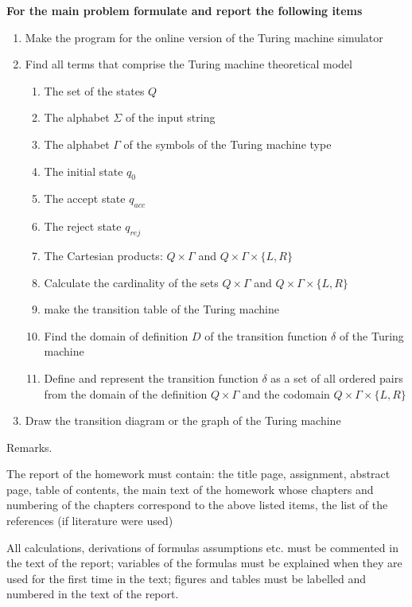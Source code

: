 \documentclass[12pt, a4paper]{report}
\begin{document}
{\bf For the main problem formulate and report the following items}

\begin{multicols}{2}
	\begin{enumerate}[label=(\Roman*)]
		\item Make the program for the online version of the Turing machine simulator
		\item Find all terms that comprise the Turing machine theoretical model
		\begin{enumerate}[label=(\arabic*)]
			\item The set of the states $ Q $
			\item The alphabet $\Sigma $ of the input string
			\item The alphabet $\Gamma$ of the symbols of the Turing machine type
			\item The initial state $q_0$
			\item The accept state $q_{acc}$
			\item The reject state $q_{rej}$
			\item The Cartesian products: $Q \times \Gamma$ and $ Q \times \Gamma \times \{L, R\} $
			\item Calculate the cardinality of the sets $ Q \times \Gamma$ and $ Q \times \Gamma \times \{L, R\}$
			\item make the transition table of the Turing machine
			\item Find the domain of definition $ D $ of the transition function $ \delta $ of the Turing machine
			\item Define and represent the transition function $ \delta $ as a set of all ordered pairs from the domain of the definition $Q \times \Gamma$ and the codomain $ Q \times \Gamma \times \{L, R\} $
		\end{enumerate}
		\item Draw the transition diagram or the graph of the Turing machine
	\end{enumerate}
\end{multicols}

Remarks.
\par
The report of the homework must contain: the title page, assignment, abstract page, table of contents, the main text of the homework whose chapters and numbering of the chapters correspond to the above listed items, the list of the references (if literature were used)
\par
All calculations, derivations of formulas assumptions etc. must be commented in the text of the report; variables of the formulas must be explained when they are used for the first time in the text; figures and tables must be labelled and numbered in the text of the report.
\end{document}
